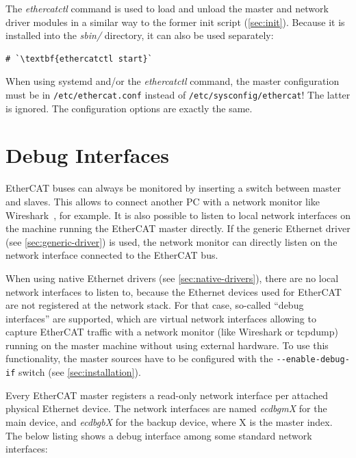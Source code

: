 \documentclass[a4paper,12pt,BCOR=6mm,bibtotoc,idxtotoc]{scrbook}
\begin{document}


The \textit{ethercatctl} command is used to load and unload the master and
network driver modules in a similar way to the former init script
(\autoref{sec:init}). Because it is installed into the \textit{sbin/}
directory, it can also be used separately:

\begin{lstlisting}[gobble=2]
  # `\textbf{ethercatctl start}`
\end{lstlisting}

When using systemd and/or the \textit{ethercatctl} command, the master
configuration must be in \texttt{/etc/ethercat.conf} instead of
\texttt{/etc/sysconfig/ethercat}! The latter is ignored. The configuration
options are exactly the same.


\section{Debug Interfaces}
\label{sec:debug}

EtherCAT buses can always be monitored by inserting a switch between master
and slaves. This allows to connect another PC with a network monitor like
Wireshark~\cite{wireshark}, for example. It is also possible to listen to
local network interfaces on the machine running the EtherCAT master directly.
If the generic Ethernet driver (see \autoref{sec:generic-driver}) is used,
the network monitor can directly listen on the network interface connected to
the EtherCAT bus.

When using native Ethernet drivers (see \autoref{sec:native-drivers}), there
are no local network interfaces to listen to, because the Ethernet devices
used for EtherCAT are not registered at the network stack. For that case,
so-called ``debug interfaces'' are supported, which are virtual network
interfaces allowing to capture EtherCAT traffic with a network monitor (like
Wireshark or tcpdump) running on the master machine without using external
hardware. To use this functionality, the master sources have to be configured
with the \lstinline+--enable-debug-if+ switch (see
\autoref{sec:installation}).

Every EtherCAT master registers a read-only network interface per attached
physical Ethernet device. The network interfaces are named \textit{ecdbgmX}
for the main device, and \textit{ecdbgbX} for the backup device, where X is
the master index. The below listing shows a debug interface among some
standard network interfaces:
\end{document}
